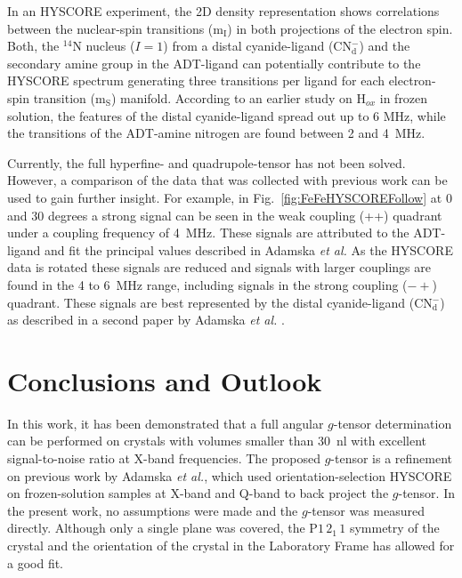In an HYSCORE experiment, the 2D density representation shows correlations between the nuclear-spin transitions (m$_\text{I}$) in both projections of the electron spin. Both, the $^{14}$N nucleus ($I=1$) from a distal cyanide-ligand (CN$_\text{d}^-$) and the secondary amine group in the ADT-ligand can potentially contribute to the HYSCORE spectrum generating three transitions per ligand for each electron-spin transition (m$_\text{S}$) manifold. According to an earlier study on H$_{ox}$ in frozen solution, the features of the distal cyanide-ligand spread out up to 6 MHz, while the transitions of the ADT-amine nitrogen are found between 2 and 4~MHz. \cite{Adamska2015,Adamska2015pdt}

Currently, the full hyperfine- and quadrupole-tensor has not been solved. However, a comparison of the data that was collected with previous work can be used to gain further insight. For example, in Fig.~\ref{fig:FeFeHYSCOREFollow} at 0 and 30 degrees a strong signal can be seen in the weak coupling (++) quadrant under a coupling frequency of 4~MHz. These signals are attributed to the ADT-ligand and fit the principal values described in Adamska \textit{ et al.} \cite{Adamska2015pdt} As the HYSCORE data is rotated these signals are reduced and signals with larger couplings are found in the 4 to 6~MHz range, including signals in the strong coupling ($-+$) quadrant. These signals are best represented by the distal cyanide-ligand (CN$_\text{d}^-$) as described in a second paper by Adamska\textit{ et al.} \cite{Adamska2015}. 

\section{Conclusions and Outlook}
In this work, it has been demonstrated that a full angular $g$-tensor determination can be performed on crystals with volumes smaller than 30~nl with excellent signal-to-noise ratio at X-band frequencies. The proposed $g$-tensor is a refinement on previous work by Adamska \textit{et al.}, which used orientation-selection HYSCORE on frozen-solution samples at X-band and Q-band to back project the $g$-tensor. In the present work, no assumptions were made and the $g$-tensor was measured directly. Although only a single plane was covered, the P$1\,2_1\,1$ symmetry of the crystal and the orientation of the crystal in the Laboratory Frame has allowed for a good fit. 

